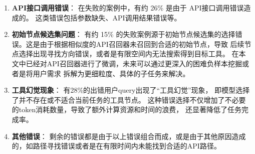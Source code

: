 \begin{enumerate}
    \item \textbf{API接口调用错误}：
    在失败的案例中，有约 26\% 是由于 API接口调用错误造成的。
    这类错误包括参数缺失、API调用结果错误等。

    \item \textbf{初始节点候选集问题}：
    有约 15\% 的失败案例源于初始节点候选集的选择错误。这是由于根据相似度的API召回器未召回到合适的初始节点，导致
    后续节点选择出现寻找方向错误，或者是有限空间内无法搜索得到目标工具。
    在本文中已经对API召回器进行了微调，未来可以通过更深入的困难负样本挖掘或者是将用户需求
    拆解为更细粒度、具体的子任务来解决。

    \item \textbf{工具幻觉现象}：
    有28\%的出错用户query出现了“工具幻觉”现象，
    即模型选择了并不存在或不适合当前任务的工具节点。
    这种错误选择不仅增加了不必要的token消耗数量，导致了额外计算资源和时间的浪费，
    还显著降低了任务完成率。

    \item \textbf{其他错误}：
    剩余的错误都是由于以上错误组合而成，或是由于其他原因造成的，如路径寻找错误或者是在有限时间内未能找到合适的API路径。

\end{enumerate}






